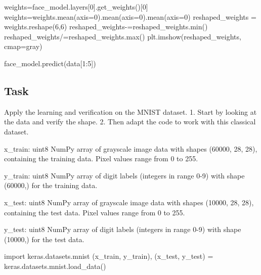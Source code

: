 \documentclass[
  letterpaper,
  DIV=11,
  numbers=noendperiod]{scrartcl}
\newenvironment{Shaded}{\begin{snugshade}}{\end{snugshade}}
\newcommand{\BuiltInTok}[1]{\textcolor[rgb]{0.00,0.23,0.31}{#1}}
\newcommand{\DecValTok}[1]{\textcolor[rgb]{0.68,0.00,0.00}{#1}}
\newcommand{\ImportTok}[1]{\textcolor[rgb]{0.00,0.46,0.62}{#1}}
\newcommand{\NormalTok}[1]{\textcolor[rgb]{0.00,0.23,0.31}{#1}}
\newcommand{\OperatorTok}[1]{\textcolor[rgb]{0.37,0.37,0.37}{#1}}
\newcommand{\StringTok}[1]{\textcolor[rgb]{0.13,0.47,0.30}{#1}}
\begin{document}
\begin{Shaded}
\begin{Highlighting}[]
\NormalTok{weights}\OperatorTok{=}\NormalTok{face\_model.layers[}\DecValTok{0}\NormalTok{].get\_weights()[}\DecValTok{0}\NormalTok{]}
\NormalTok{weights}\OperatorTok{=}\NormalTok{weights.mean(axis}\OperatorTok{=}\DecValTok{0}\NormalTok{).mean(axis}\OperatorTok{=}\DecValTok{0}\NormalTok{).mean(axis}\OperatorTok{=}\DecValTok{0}\NormalTok{)}
\NormalTok{reshaped\_weights }\OperatorTok{=}\NormalTok{ weights.reshape(}\DecValTok{6}\NormalTok{,}\DecValTok{6}\NormalTok{)}
\NormalTok{reshaped\_weights}\OperatorTok{{-}=}\NormalTok{reshaped\_weights.}\BuiltInTok{min}\NormalTok{()}
\NormalTok{reshaped\_weights}\OperatorTok{/=}\NormalTok{reshaped\_weights.}\BuiltInTok{max}\NormalTok{()}
\NormalTok{plt.imshow(reshaped\_weights, cmap}\OperatorTok{=}\StringTok{\textquotesingle{}gray\textquotesingle{}}\NormalTok{)}

\end{Highlighting}
\end{Shaded}

\begin{Shaded}
\begin{Highlighting}[]
\NormalTok{face\_model.predict(data[}\DecValTok{1}\NormalTok{:}\DecValTok{5}\NormalTok{])}
\end{Highlighting}
\end{Shaded}

\subsection{Task}\label{task-3}

Apply the learning and verification on the MNIST dataset. 1. Start by
looking at the data and verify the shape. 2. Then adapt the code to work
with this classical dataset.

x\_train: uint8 NumPy array of grayscale image data with shapes (60000,
28, 28), containing the training data. Pixel values range from 0 to 255.

y\_train: uint8 NumPy array of digit labels (integers in range 0-9) with
shape (60000,) for the training data.

x\_test: uint8 NumPy array of grayscale image data with shapes (10000,
28, 28), containing the test data. Pixel values range from 0 to 255.

y\_test: uint8 NumPy array of digit labels (integers in range 0-9) with
shape (10000,) for the test data.

\begin{Shaded}
\begin{Highlighting}[]
\ImportTok{import}\NormalTok{ keras.datasets.mnist}
\NormalTok{(x\_train, y\_train), (x\_test, y\_test) }\OperatorTok{=}\NormalTok{ keras.datasets.mnist.load\_data()}
\end{Highlighting}
\end{Shaded}
\end{document}
